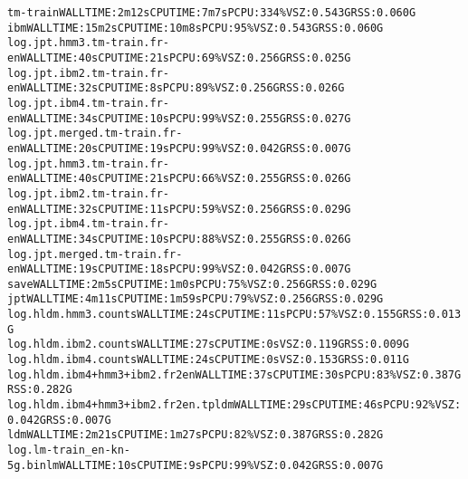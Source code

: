 \documentclass[11pt,letterpaper]{article}
\begin{document}
\begin{tiny}
\begin{alltt}
         tm-train                                         WALL TIME: 2m12s    CPU TIME: 7m7s      PCPU: 334\%   VSZ: 0.543G    RSS: 0.060G
      ibm                                                 WALL TIME: 15m2s    CPU TIME: 10m8s     PCPU: 95\%    VSZ: 0.543G    RSS: 0.060G
         log.jpt.hmm3.tm-train.fr-en                      WALL TIME: 40s      CPU TIME: 21s       PCPU: 69\%    VSZ: 0.256G    RSS: 0.025G
         log.jpt.ibm2.tm-train.fr-en                      WALL TIME: 32s      CPU TIME: 8s        PCPU: 89\%    VSZ: 0.256G    RSS: 0.026G
         log.jpt.ibm4.tm-train.fr-en                      WALL TIME: 34s      CPU TIME: 10s       PCPU: 99\%    VSZ: 0.255G    RSS: 0.027G
         log.jpt.merged.tm-train.fr-en                    WALL TIME: 20s      CPU TIME: 19s       PCPU: 99\%    VSZ: 0.042G    RSS: 0.007G
            log.jpt.hmm3.tm-train.fr-en                   WALL TIME: 40s      CPU TIME: 21s       PCPU: 66\%    VSZ: 0.255G    RSS: 0.026G
            log.jpt.ibm2.tm-train.fr-en                   WALL TIME: 32s      CPU TIME: 11s       PCPU: 59\%    VSZ: 0.256G    RSS: 0.029G
            log.jpt.ibm4.tm-train.fr-en                   WALL TIME: 34s      CPU TIME: 10s       PCPU: 88\%    VSZ: 0.255G    RSS: 0.026G
            log.jpt.merged.tm-train.fr-en                 WALL TIME: 19s      CPU TIME: 18s       PCPU: 99\%    VSZ: 0.042G    RSS: 0.007G
         save                                             WALL TIME: 2m5s     CPU TIME: 1m0s      PCPU: 75\%    VSZ: 0.256G    RSS: 0.029G
      jpt                                                 WALL TIME: 4m11s    CPU TIME: 1m59s     PCPU: 79\%    VSZ: 0.256G    RSS: 0.029G
         log.hldm.hmm3.counts                             WALL TIME: 24s      CPU TIME: 11s       PCPU: 57\%    VSZ: 0.155G    RSS: 0.013G
         log.hldm.ibm2.counts                             WALL TIME: 27s      CPU TIME: 0s                     VSZ: 0.119G    RSS: 0.009G
         log.hldm.ibm4.counts                             WALL TIME: 24s      CPU TIME: 0s                     VSZ: 0.153G    RSS: 0.011G
         log.hldm.ibm4+hmm3+ibm2.fr2en                    WALL TIME: 37s      CPU TIME: 30s       PCPU: 83\%    VSZ: 0.387G    RSS: 0.282G
         log.hldm.ibm4+hmm3+ibm2.fr2en.tpldm              WALL TIME: 29s      CPU TIME: 46s       PCPU: 92\%    VSZ: 0.042G    RSS: 0.007G
      ldm                                                 WALL TIME: 2m21s    CPU TIME: 1m27s     PCPU: 82\%    VSZ: 0.387G    RSS: 0.282G
         log.lm-train_en-kn-5g.binlm                      WALL TIME: 10s      CPU TIME: 9s        PCPU: 99\%    VSZ: 0.042G    RSS: 0.007G

\end{alltt}
\end{tiny}
\end{document}
